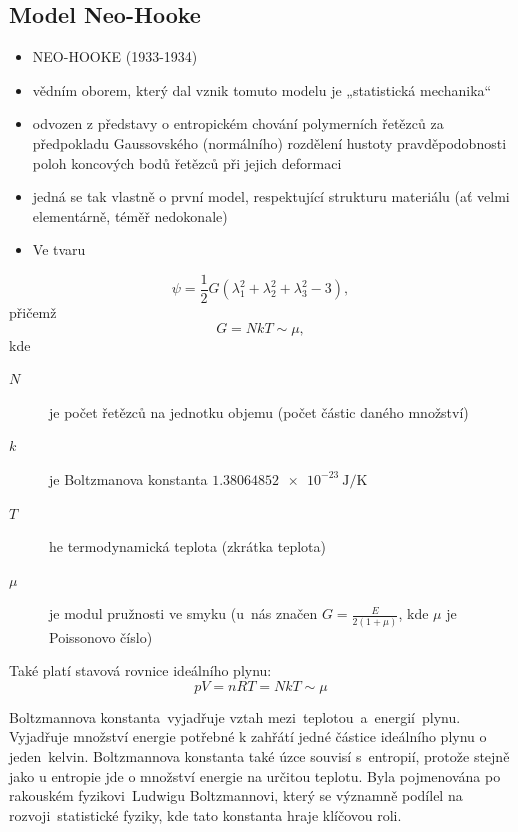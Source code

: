 
\subsection{Model Neo-Hooke}\label{sec:neo-hooke}
\begin{itemize}
	\item NEO-HOOKE (1933-1934) 
	\item vědním oborem, který dal vznik tomuto modelu je „statistická mechanika“
	\item odvozen z představy o entropickém chování polymerních řetězců za předpokladu Gaussovského (normálního) rozdělení hustoty pravděpodobnosti poloh koncových bodů řetězců při jejich deformaci
	\item jedná se tak vlastně o první model, respektující strukturu materiálu (ať velmi elementárně, téměř nedokonale)
	\item Ve tvaru
\end{itemize}
\begin{equation}
	\psi = \frac{1}{2} G \left( \lambda_1^2 + \lambda_2^2 + \lambda_3^2 - 3 \right),
\end{equation}
přičemž
\begin{equation}
	G = N k T \sim \mu,
\end{equation}
kde
\begin{description}
	\item[$N$] je počet řetězců na jednotku objemu (počet částic daného množství)
	\item[$k$] je Boltzmanova konstanta $\SI{1.38064852e-23}{\joule\per\kelvin}$
	\item[$T$] he termodynamická teplota (zkrátka teplota)
	\item[$\mu$] je modul pružnosti ve smyku (u~nás značen $G = \frac{E}{2(1+\mu)}$, kde $\mu$ je Poissonovo číslo)
\end{description}

Také platí stavová rovnice ideálního plynu:
\begin{equation}
	p V = n R T = N k T \sim \mu
\end{equation}

Boltzmannova konstanta vyjadřuje vztah mezi teplotou a energií plynu. Vyjadřuje množství energie potřebné k zahřátí jedné částice ideálního plynu o jeden kelvin. Boltzmannova konstanta také úzce souvisí s entropií, protože stejně jako u entropie jde o množství energie na určitou teplotu. Byla pojmenována po rakouském fyzikovi Ludwigu Boltzmannovi, který se významně podílel na rozvoji statistické fyziky, kde tato konstanta hraje klíčovou roli.

